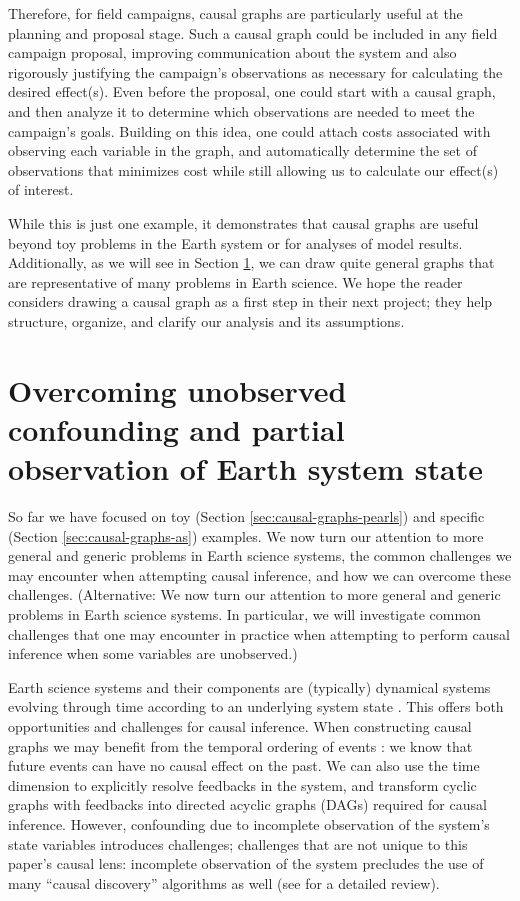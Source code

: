 \documentclass[12pt]{article}
\begin{document}
Therefore, for field campaigns, causal graphs are particularly useful at the
planning and proposal stage. Such a causal graph could be included in
any field campaign proposal, improving communication about the system
and also rigorously justifying the campaign’s observations as
necessary for calculating the desired effect(s). Even before the
proposal, one could start with a causal graph, and then analyze it to
determine which observations are needed to meet the campaign’s
goals. Building on this idea, one could attach costs associated with
observing each variable in the graph, and automatically determine the
set of observations that minimizes cost while still allowing us to
calculate our effect(s) of interest.

While this is just one example, it demonstrates that causal graphs are
useful beyond toy problems in the Earth system or for analyses of model results. Additionally, as we
will see in Section \ref{sec:necess-cond-caus}, we can draw quite
general graphs that are representative of many problems in Earth
science. We hope the reader considers drawing a causal graph as a
first step in their next project; they help structure, organize, and
clarify our analysis and its assumptions.


\section{Overcoming unobserved confounding and partial observation of Earth system state}
\label{sec:necess-cond-caus}

So far we have focused on toy (Section
\ref{sec:causal-graphs-pearls}) and specific (Section
\ref{sec:causal-graphs-as}) examples. We now turn our attention to
more general and generic problems in Earth science systems, the common
challenges we may encounter when attempting causal inference, and how
we can overcome these challenges. (Alternative: We now turn our
attention to more general and generic problems in Earth science
systems. In particular, we will investigate common challenges that one
may encounter in practice when attempting to perform causal inference
when some variables are unobserved.)

Earth science systems and their components are (typically) dynamical systems evolving
through time according to an underlying system state
\citep{lorenz-1963,lorenz1996predictability,majda-state}. This offers
both opportunities and challenges for causal inference. When constructing
causal graphs we may benefit from the temporal ordering of events
\citep{runge2019inferring}: we know that future events can have no
causal effect on the past. We can also use the time dimension to
explicitly resolve feedbacks in the system, and transform cyclic
graphs with feedbacks into directed acyclic graphs (DAGs) required for
causal inference. However, confounding due to incomplete observation
of the system's state variables introduces challenges; challenges that
are not unique to this paper's causal lens: incomplete observation of
the system precludes the use of many ``causal discovery'' algorithms as well (see
\citet{runge2019inferring} for a detailed review).
\end{document}
